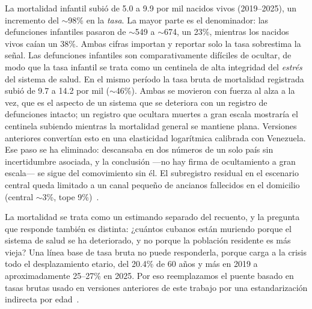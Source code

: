 \documentclass[11pt,a4paper]{article}
\begin{document}
La mortalidad infantil subió de 5.0 a 9.9 por mil nacidos vivos (2019--2025), un incremento del $\sim$98\% en la \emph{tasa}.
La mayor parte es el denominador: las defunciones infantiles pasaron de $\sim$549 a $\sim$674, un 23\%, mientras los nacidos vivos caían un 38\%.
Ambas cifras importan y reportar solo la tasa sobrestima la señal.
Las defunciones infantiles son comparativamente difíciles de ocultar, de modo que la tasa infantil se trata como un centinela de alta integridad del \emph{estrés} del sistema de salud.
En el mismo período la tasa bruta de mortalidad registrada subió de 9.7 a 14.2 por mil ($\sim$46\%).
Ambas se movieron con fuerza al alza a la vez, que es el aspecto de un sistema que se deteriora con un registro de defunciones intacto; un registro que ocultara muertes a gran escala mostraría el centinela subiendo mientras la mortalidad general se mantiene plana.
Versiones anteriores convertían esto en una elasticidad logarítmica calibrada con Venezuela.
Ese paso se ha eliminado: descansaba en dos números de un solo país sin incertidumbre asociada, y la conclusión ---no hay firma de ocultamiento a gran escala--- se sigue del comovimiento sin él.
El subregistro residual en el escenario central queda limitado a un canal pequeño de ancianos fallecidos en el domicilio (central $\sim$3\%, tope 9\%)~\citep{modeld}.

La mortalidad se trata como un estimando separado del recuento, y la pregunta que responde también es distinta: ¿cuántos cubanos están muriendo porque el sistema de salud se ha deteriorado, y no porque la población residente es más vieja?
Una línea base de tasa bruta no puede responderla, porque carga a la crisis todo el desplazamiento etario, del 20.4\% de 60 años y más en 2019 a aproximadamente 25--27\% en 2025.
Por eso reemplazamos el puente basado en tasas brutas usado en versiones anteriores de este trabajo por una estandarización indirecta por edad~\citep{preston2001}.
\end{document}
